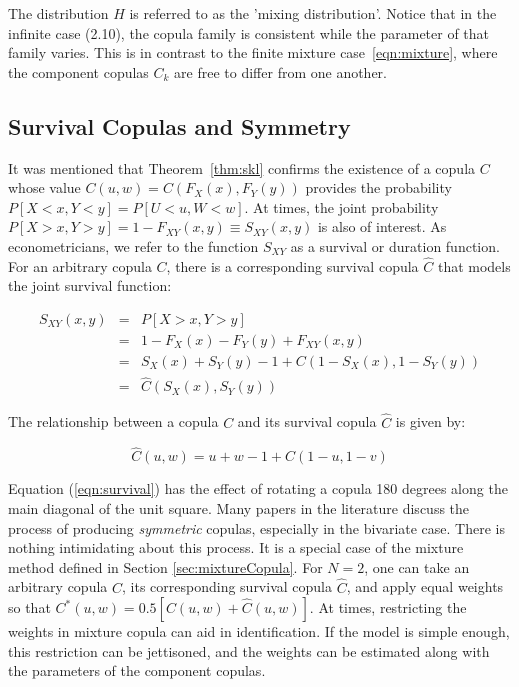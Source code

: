 The distribution $H$ is referred to as the 'mixing distribution'. Notice that in the infinite case (2.10), the copula family is consistent while the parameter of that family varies. This is in contrast to the finite mixture case~\ref{eqn:mixture}, where the component copulas $C_{k}$ are free to differ from one another.


\subsection{Survival Copulas and Symmetry}

It was mentioned that Theorem~\ref{thm:skl} confirms the existence of a copula $C$ whose value $C\left(u,w\right) = C\left(F_{X}\left(x\right), F_{Y}\left(y\right)\right)$ provides the probability $P\left[X < x, Y < y\right] = P\left[U < u, W < w\right]$. At times, the joint probability $P\left[X > x, Y > y\right] = 1-F_{XY}\left(x,y\right)\equiv S_{XY}\left(x,y\right)$ is also of interest. As econometricians, we refer to the function $S_{XY}$ as a survival or duration function. For an arbitrary copula $C$, there is a corresponding survival copula $\hat{C}$ that models the joint survival function:

\begin{eqnarray*}
S_{XY}\left(x,y\right) &=& P\left[X > x, Y > y\right] \\
						&=& 1-F_{X}\left(x\right) - F_{Y}\left(y\right) + F_{XY}\left(x,y\right) \\
						&=& S_{X}\left(x\right) + S_{Y}\left(y\right) - 1 + C\left(1 - S_{X}\left(x\right), 1 - S_{Y}\left(y\right)\right) \\
						&=& \hat{C}\left(S_{X}\left(x\right), S_{Y}\left(y\right)\right)
\end{eqnarray*}

The relationship between a copula $C$ and its survival copula $\hat{C}$ is given by:

\begin{equation} \label{eqn:survival}
	\hat{C}\left( u,w\right) =u+w-1+C\left( 1-u,1-v\right)
\end{equation}

Equation (\ref{eqn:survival}) has the effect of rotating a copula 180 degrees along the main diagonal of the unit square. Many papers in the literature discuss the process of producing \textit{symmetric} copulas, especially in the bivariate case. There is nothing intimidating about this process. It is a special case of the mixture method defined in Section \ref{sec:mixtureCopula}. For $N=2$, one can take an arbitrary copula $C$, its corresponding survival copula $\hat{C}$, and apply equal weights so that $C^{\ast}\left(u,w\right) = 0.5\left[ C\left(u,w\right) +\hat{C}\left(u,w\right)\right]$. At times, restricting the weights in mixture copula can aid in identification. If the model is simple enough, this restriction can be jettisoned, and the weights can be estimated along with the parameters of the component copulas.

